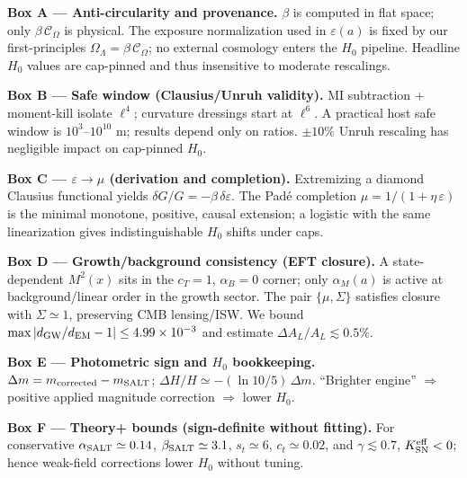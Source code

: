 \documentclass[aps,prd,onecolumn,notitlepage,superscriptaddress,nofootinbib]{revtex4-2}
\newcommand{\COmega}{\mathcal{C}_{\Omega}}
\newcommand{\OL}{\Omega_{\Lambda}}
\newcommand{\alpham}{\alpha_M}
\newcommand{\Hzero}{H_0}
\newcommand{\eps}{\varepsilon}
\begin{document}
\begin{infobox}
\textbf{Box A — Anti-circularity and provenance.}
\(\beta\) is computed in flat space; only \(\beta\,\COmega\) is physical. The exposure normalization used in \(\eps(a)\) is fixed by our first-principles \(\OL=\beta\,\COmega\); no external cosmology enters the \(\Hzero\) pipeline. Headline \(\Hzero\) values are cap-pinned and thus insensitive to moderate rescalings.
\end{infobox}

\begin{infobox}
\textbf{Box B — Safe window (Clausius/Unruh validity).}
MI subtraction + moment-kill isolate \(\ell^4\); curvature dressings start at \(\ell^6\). A practical host safe window is \(10^3\)--\(10^{10}\) m; results depend only on ratios. \(\pm 10\%\) Unruh rescaling has negligible impact on cap-pinned \(\Hzero\).
\end{infobox}

\begin{infobox}
\textbf{Box C — \(\eps\to\mu\) (derivation and completion).}
Extremizing a diamond Clausius functional yields \(\delta G/G=-\beta\,\delta\eps\). The Padé completion \(\mu=1/(1+\eta\,\eps)\) is the minimal monotone, positive, causal extension; a logistic with the same linearization gives indistinguishable \(\Hzero\) shifts under caps.
\end{infobox}

\begin{infobox}
\textbf{Box D — Growth/background consistency (EFT closure).}
A state-dependent \(M^2(x)\) sits in the \(c_T=1\), \(\alpha_B=0\) corner; only \(\alpham(a)\) is active at background/linear order in the growth sector. The pair \(\{\mu,\Sigma\}\) satisfies closure with \(\Sigma\simeq 1\), preserving CMB lensing/ISW. We bound \(\max|d_{\rm GW}/d_{\rm EM}-1|\le 4.99\times 10^{-3}\) and estimate \(\Delta A_L/A_L\lesssim 0.5\%\).
\end{infobox}

\begin{infobox}
\textbf{Box E — Photometric sign and \(\Hzero\) bookkeeping.}
\(\Delta m=m_{\rm corrected}-m_{\rm SALT}\); \(\Delta H/H\simeq -(\ln 10/5)\,\Delta m\). ``Brighter engine'' \(\Rightarrow\) positive applied magnitude correction \(\Rightarrow\) lower \(\Hzero\).
\end{infobox}

\begin{infobox}
\textbf{Box F — Theory+ bounds (sign-definite without fitting).}
For conservative \(\alpha_{\rm SALT}\simeq 0.14\), \(\beta_{\rm SALT}\simeq 3.1\), \(s_t\simeq 6\), \(c_t\simeq 0.02\), and \(\gamma\lesssim 0.7\), \(K_{\rm SN}^{\rm eff}<0\); hence weak-field corrections lower \(\Hzero\) without tuning.
\end{infobox}
\end{document}

